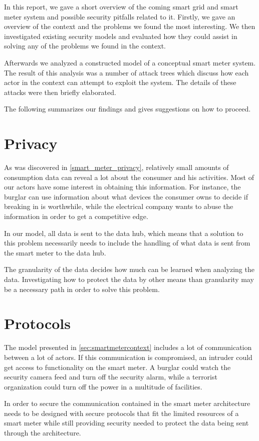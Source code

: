 In this report, we gave a short overview of the coming smart grid and smart meter system and possible security pitfalls related to it.
Firstly, we gave an overview of the context and the problems we found the most interesting.
We then investigated existing security models and evaluated how they could assist in solving any of the problems we found in the context.

Afterwards we analyzed a constructed model of a conceptual smart meter system.
The result of this analysis was a number of attack trees which discuss how each actor in the context can attempt to exploit the system.
The details of these attacks were then briefly elaborated.

The following summarizes our findings and gives suggestions on how to proceed.

\section{Privacy}
As was discovered in \cref{smart_meter_privacy}, relatively small amounts of consumption data can reveal a lot about the consumer and his activities.
Most of our actors have some interest in obtaining this information.
For instance, the burglar can use information about what devices the consumer owns to decide if breaking in is worthwhile, while the electrical company wants to abuse the information in order to get a competitive edge.

In our model, all data is sent to the data hub, which means that a solution to this problem necessarily needs to include the handling of what data is sent from the smart meter to the data hub.

The granularity of the data decides how much can be learned when analyzing the data.
Investigating how to protect the data by other means than granularity may be a necessary path in order to solve this problem.

\section{Protocols}
The model presented in \cref{sec:smartmetercontext} includes a lot of communication between a lot of actors.
If this communication is compromised, an intruder could get access to functionality on the smart meter.
A burglar could watch the security camera feed and turn off the security alarm, while a terrorist organization could turn off the power in a multitude of facilities.

In order to secure the communication contained in the smart meter architecture needs to be designed with secure protocols that fit the limited resources of a smart meter while still providing security needed to protect the data being sent through the architecture.


